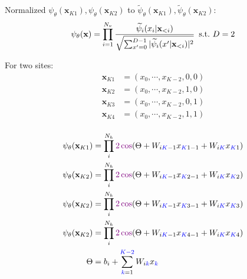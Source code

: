 \noindent Normalized $\psi_{\theta}(\mathbf{x}_{K1}), \psi_{\theta}(\mathbf{x}_{K2})$
to $\widetilde{\psi}_{\theta}(\mathbf{x}_{K1}), \widetilde{\psi}_{\theta}(\mathbf{x}_{K2})$:
\begin{equation}
    \psi_{\theta}(\mathbf{x}) = \prod_{i=1}^{N_v}\frac{\widetilde{\psi}_i(x_i|\mathbf{x}_{<i})}
    {\sqrt{\sum_{x^\prime = 0}^{D-1}\vert \widetilde{\psi}_i(x^\prime |\mathbf{x}_{<i})\vert^2}}
    \enskip \mathrm{s.t.} ~ D = 2
\end{equation}

For two sites:
\begin{equation}
    \begin{split}
    \mathbf{x}_{K1} & = (x_0, \cdots, x_{K-2}, 0, 0) \\
    \mathbf{x}_{K2} & = (x_0, \cdots, x_{K-2}, 1, 0) \\
    \mathbf{x}_{K3} & = (x_0, \cdots, x_{K-2}, 0, 1) \\
    \mathbf{x}_{K4} & = (x_0, \cdots, x_{K-2}, 1, 1) \\
    \end{split}
\end{equation}

\begin{equation}
    \begin{split}
    \psi_{\theta}(\mathbf{x}_{K1}) & = \prod_{i}^{N_h}\textcolor{violet}{2\cos}
        (\Theta +W_{i\textcolor{blue}{K}-1}x_{\textcolor{blue}{K}1-1} + W_{i\textcolor{blue}{K}}x_{\textcolor{blue}{K}1}) \\
    \psi_{\theta}(\mathbf{x}_{K2}) & = \prod_{i}^{N_h}\textcolor{violet}{2\cos}
        (\Theta +W_{i\textcolor{blue}{K}-1}x_{\textcolor{blue}{K}2-1} + W_{i\textcolor{blue}{K}}x_{\textcolor{blue}{K}2})\\
    \psi_{\theta}(\mathbf{x}_{K2}) & = \prod_{i}^{N_h}\textcolor{violet}{2\cos}
        (\Theta +W_{i\textcolor{blue}{K}-1}x_{\textcolor{blue}{K}3-1} + W_{i\textcolor{blue}{K}}x_{\textcolor{blue}{K}3})\\
    \psi_{\theta}(\mathbf{x}_{K2}) & = \prod_{i}^{N_h}\textcolor{violet}{2\cos}
        (\Theta +W_{i\textcolor{blue}{K}-1}x_{\textcolor{blue}{K}4-1} + W_{i\textcolor{blue}{K}}x_{\textcolor{blue}{K}4})\\
    \Theta & = b_i + \sum_{\textcolor{blue}{k}=1}^{\textcolor{blue}{K-2}}W_{i\textcolor{blue}{k}}x_{\textcolor{blue}{k}} \\
    \end{split}
\end{equation}

